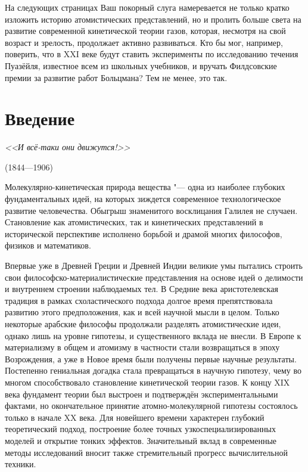 \documentclass[a4paper, 12pt, oneside]{article} %
\begin{document}
На следующих страницах Ваш покорный слуга намеревается не только кратко
изложить историю атомистических представлений, но и пролить больше света
на развитие современной кинетической теории газов, которая, несмотря на
свой возраст и зрелость, продолжает активно развиваться. Кто бы мог,
например, поверить, что в XXI веке будут ставить эксперименты по
исследованию течения Пуазёйля, известное всем из школьных учебников, и
вручать Филдсовские премии за развитие работ Больцмана? Тем не менее,
это так.

\section*{Введение}

\epigraph{\textit{<<И всё-таки они движутся!>>}}{ (1844---1906)}

Молекулярно-кинетическая природа вещества "--- одна из наиболее глубоких
фундаментальных идей, на которых зиждется современное технологическое
развитие человечества. Обыгрыш знаменитого восклицания Галилея не
случаен. Становление как атомистических, так и кинетических
представлений в исторической перспективе исполнено борьбой и драмой
многих философов, физиков и математиков.

Впервые уже в Древней Греции и Древней Индии великие умы пытались
строить свои философско-материалистические представления на основе идей
о делимости и внутреннем строении наблюдаемых тел. В Средние века
аристотелевская традиция в рамках схоластического подхода долгое время
препятствовала развитию этого предположения, как и всей научной мысли в
целом. Только некоторые арабские философы продолжали разделять
атомистические идеи, однако лишь на уровне гипотезы, и существенного
вклада не внесли. В Европе к материализму в общем и атомизму в частности
стали возвращаться в эпоху Возрождения, а уже в Новое время были
получены первые научные результаты. Постепенно гениальная догадка стала
превращаться в научную гипотезу, чему во многом способствовало
становление кинетической теории газов. К концу XIX века фундамент теории
был выстроен и подтверждён экспериментальными фактами, но окончательное
принятие атомно-молекулярной гипотезы состоялось только в начале XX
века. Для новейшего времени характерен глубокий теоретический подход,
построение более точных узкоспециализированных моделей и открытие тонких
эффектов. Значительный вклад в современные методы исследований вносит также
стремительный прогресс вычислительной техники.
\end{document}
